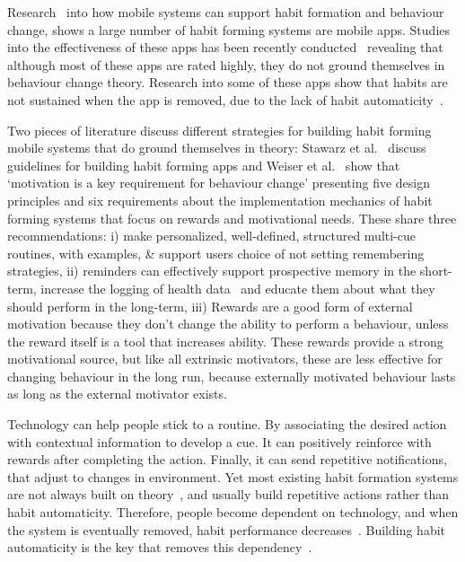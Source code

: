 \documentclass{scaffold/sigchi}
\begin{document}
Research~\cite{survey_on_apps_2,survey_on_current_apps_of_steel} into how mobile systems can support habit formation and behaviour change, shows a large number of habit forming systems are mobile apps. Studies into the effectiveness of these apps has been recently conducted~\cite{article_beyond_self_tracking_designing_apps, article_dont_kick_habit} revealing that although most of these apps are rated highly, they do not ground themselves in behaviour change theory. Research into some of these apps show that habits are not sustained when the app is removed, due to the lack of habit automaticity~\cite{article_beyond_self_tracking_designing_apps}.

Two pieces of literature discuss different strategies for building habit forming mobile systems that do ground themselves in theory: Stawarz et al.~\cite{article_beyond_self_tracking_designing_apps} discuss guidelines for building habit forming apps and Weiser et al.~\cite{article_taxonomy_motivational_affordances_meaningful} show that `motivation is a key requirement for behaviour change' presenting five design principles and six requirements about the implementation mechanics of habit forming systems that focus on rewards and motivational needs. These share three recommendations: i) make personalized, well-defined, structured multi-cue routines, with examples, \& support users choice of not setting remembering strategies, ii) reminders can effectively support prospective memory in the short-term, increase the logging of health data~\cite{the_power_of_logging_mobile_notifications} and educate them about what they should perform in the long-term, iii) Rewards are a good form of external motivation because they don't change the ability to perform a behaviour, unless the reward itself is a tool that increases ability. These rewards provide a strong motivational source, but like all extrinsic motivators, these are less effective for changing behaviour in the long run, because externally motivated behaviour lasts as long as the external motivator exists.

Technology can help people stick to a routine. By associating the desired action with contextual information to develop a cue. It can positively reinforce with rewards after completing the action. Finally, it can send repetitive notifications, that adjust to changes in environment.
Yet most existing habit formation systems are not always built on theory~\cite{article_beyond_self_tracking_designing_apps, article_dont_kick_habit}, and usually build repetitive actions rather than habit automaticity.
Therefore, people become dependent on technology, and when the system is eventually removed, habit performance decreases~\cite{}. Building habit automaticity is the key that removes this dependency~\cite{article_beyond_self_tracking_designing_apps}.
\end{document}
